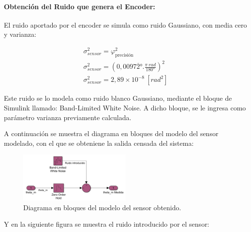 \documentclass{article}
\begin{document}
\begin{sloppypar}
\paragraph{Obtención del Ruido que genera el Encoder:}
\label{sec:Obtención del Ruido que genera el Encoder:}
\hfill

\hfill

El ruido aportado por el encoder se simula como ruido Gaussiano, con media cero y varianza:

\begin{subequations} \label{eq:Cálculo de la Varianza correspondiente al ruido aportado por la precisión del sensor}
	\begin{align}
        \sigma_{sensor}^2=\varphi_{\text{precisión}}^2
        \\
        \sigma_{sensor}^2=(0,0097\overline{2}\text{°}.\frac{\pi ~rad}{180\text{°}})^2
        \\
        \label{eq:Varianza} \sigma_{sensor}^2=2,89\times10^{-8} ~[rad^2]
	\end{align}
\end{subequations}

Este ruido se lo modela como ruido blanco Gaussiano, mediante el bloque de Simulink llamado: Band-Limited White Noise. A dicho bloque, se le ingresa como parámetro varianza previamente calculada.

A continuación se muestra el diagrama en bloques del modelo del sensor modelado, con el que se obteniene la salida censada del sistema:

\begin{figure}[H]
    \centering
    \includegraphics[width=0.5\textwidth]{Diagrama en bloques del modelo del sensor obtenido}
    \caption{Diagrama en bloques del modelo del sensor obtenido.}
    \label{fig:Diagrama en bloques del modelo del sensor obtenido}
\end{figure}

Y en la siguiente figura se muestra el ruido introducido por el sensor:


\end{sloppypar}
\end{document}

